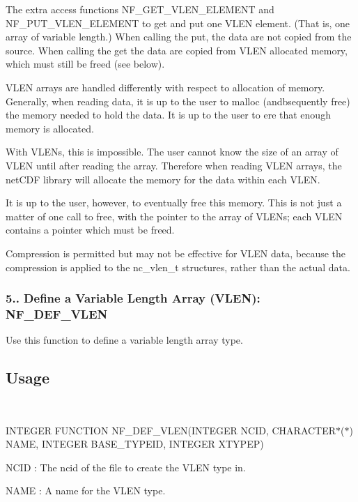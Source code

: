 The extra access functions N\+F\+\_\+\+G\+E\+T\+\_\+\+V\+L\+E\+N\+\_\+\+E\+L\+E\+M\+E\+NT and N\+F\+\_\+\+P\+U\+T\+\_\+\+V\+L\+E\+N\+\_\+\+E\+L\+E\+M\+E\+NT to get and put one V\+L\+EN element. (That is, one array of variable length.) When calling the put, the data are not copied from the source. When calling the get the data are copied from V\+L\+EN allocated memory, which must still be freed (see below).

V\+L\+EN arrays are handled differently with respect to allocation of memory. Generally, when reading data, it is up to the user to malloc (andbsequently free) the memory needed to hold the data. It is up to the user to ere that enough memory is allocated.

With V\+L\+E\+Ns, this is impossible. The user cannot know the size of an array of V\+L\+EN until after reading the array. Therefore when reading V\+L\+EN arrays, the net\+C\+DF library will allocate the memory for the data within each V\+L\+EN.

It is up to the user, however, to eventually free this memory. This is not just a matter of one call to free, with the pointer to the array of V\+L\+E\+Ns; each V\+L\+EN contains a pointer which must be freed.

Compression is permitted but may not be effective for V\+L\+EN data, because the compression is applied to the nc\+\_\+vlen\+\_\+t structures, rather than the actual data.

\subsubsection*{5.. Define a Variable Length Array (V\+L\+EN)\+: N\+F\+\_\+\+D\+E\+F\+\_\+\+V\+L\+EN}

Use this function to define a variable length array type.

\subsection*{Usage }

 

I\+N\+T\+E\+G\+ER F\+U\+N\+C\+T\+I\+ON N\+F\+\_\+\+D\+E\+F\+\_\+\+V\+L\+EN(I\+N\+T\+E\+G\+ER N\+C\+ID, C\+H\+A\+R\+A\+C\+T\+E\+R$\ast$($\ast$) N\+A\+ME, I\+N\+T\+E\+G\+ER B\+A\+S\+E\+\_\+\+T\+Y\+P\+E\+ID, I\+N\+T\+E\+G\+ER X\+T\+Y\+P\+EP)

{\ttfamily N\+C\+ID} \+: The ncid of the file to create the V\+L\+EN type in.

{\ttfamily N\+A\+ME} \+: A name for the V\+L\+EN type.

